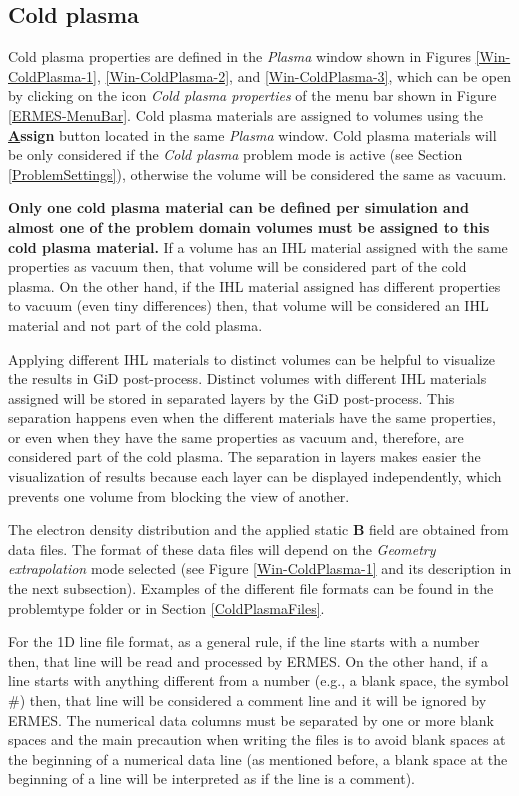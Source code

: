 \subsection{Cold plasma}\label{ColdPlasmaMaterial}

Cold plasma properties are defined in the \textit{Plasma} window shown in Figures \ref{Win-ColdPlasma-1}, \ref{Win-ColdPlasma-2}, and \ref{Win-ColdPlasma-3}, which can be open by clicking on the icon \textit{Cold plasma properties} of the menu bar shown in Figure \ref{ERMES-MenuBar}. Cold plasma materials are assigned to volumes using the \textbf{\underline{A}ssign} button located in the same \textit{Plasma} window. Cold plasma materials will be only considered if the \textit{Cold plasma} problem mode is active (see Section \ref{ProblemSettings}), otherwise the volume will be considered the same as vacuum.

\textbf{Only one cold plasma material can be defined per simulation and almost one of the problem domain volumes must be assigned to this cold plasma material.} If a volume has an IHL material assigned with the same properties as vacuum then, that volume will be considered part of the cold plasma. On the other hand, if the IHL material assigned has different properties to vacuum (even tiny differences) then, that volume will be considered an IHL material and not part of the cold plasma. 

Applying different IHL materials to distinct volumes can be helpful to visualize the results in GiD post-process. Distinct volumes with different IHL materials assigned will be stored in separated layers by the GiD post-process. This separation happens even when the different materials have the same properties, or even when they have the same properties as vacuum and, therefore, are considered part of the cold plasma. The separation in layers makes easier the visualization of results because each layer can be displayed independently, which prevents one volume from blocking the view of another. 

The electron density distribution and the applied static \textbf{B} field are obtained from data files. The format of these data files will depend on the \textit{Geometry extrapolation} mode selected (see Figure \ref{Win-ColdPlasma-1} and its description in the next subsection). Examples of the different file formats can be found in the problemtype folder  or in Section \ref{ColdPlasmaFiles}. 

For the 1D line file format, as a general rule, if the line starts with a number then, that line will be read and processed by ERMES. On the other hand, if a line starts with anything different from a number (e.g., a blank space, the symbol $\#$) then, that line will be considered a comment line and it will be ignored by ERMES. The numerical data columns must be separated by one or more blank spaces and the main precaution when writing the files is to avoid blank spaces at the beginning of a numerical data line (as mentioned before, a blank space at the beginning of a line will be interpreted as if the line is a comment).


